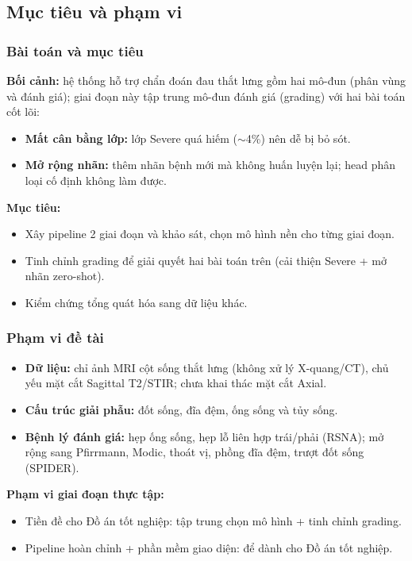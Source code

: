 \documentclass{beamer}
\numberwithin{figure}{section}
\numberwithin{table}{section}
\begin{document}
\subsection{Mục tiêu và phạm vi}
\begin{frame}
\frametitle{Bài toán và mục tiêu}
\textbf{Bối cảnh:} hệ thống hỗ trợ chẩn đoán đau thắt lưng gồm hai mô-đun (phân vùng và đánh giá); giai đoạn này tập trung mô-đun đánh giá (grading) với hai bài toán cốt lõi:
\begin{itemize}\small
    \item[\textbf{1.}] \textbf{Mất cân bằng lớp:} lớp Severe quá hiếm ($\sim$4\%) nên dễ bị bỏ sót.
    \item[\textbf{2.}] \textbf{Mở rộng nhãn:} thêm nhãn bệnh mới mà không huấn luyện lại; head phân loại cố định không làm được.
\end{itemize}
\vspace{0.3em}
\textbf{Mục tiêu:}
\begin{itemize}\small
    \item[--] Xây pipeline 2 giai đoạn và khảo sát, chọn mô hình nền cho từng giai đoạn.
    \item[--] Tinh chỉnh grading để giải quyết hai bài toán trên (cải thiện Severe + mở nhãn zero-shot).
    \item[--] Kiểm chứng tổng quát hóa sang dữ liệu khác.
\end{itemize}
\end{frame}

\begin{frame}
\frametitle{Phạm vi đề tài}
\begin{itemize}
    \item[--] \textbf{Dữ liệu:} chỉ ảnh MRI cột sống thắt lưng (không xử lý X-quang/CT), chủ yếu mặt cắt Sagittal T2/STIR; chưa khai thác mặt cắt Axial.
    \item[--] \textbf{Cấu trúc giải phẫu:} đốt sống, đĩa đệm, ống sống và tủy sống.
    \item[--] \textbf{Bệnh lý đánh giá:} hẹp ống sống, hẹp lỗ liên hợp trái/phải (RSNA); mở rộng sang Pfirrmann, Modic, thoát vị, phồng đĩa đệm, trượt đốt sống (SPIDER).
\end{itemize}
\pause
\textbf{Phạm vi giai đoạn thực tập:}
\begin{itemize}
    \item[--] Tiền đề cho Đồ án tốt nghiệp: tập trung chọn mô hình + tinh chỉnh grading.
    \item[$\rightarrow$] Pipeline hoàn chỉnh + phần mềm giao diện: để dành cho Đồ án tốt nghiệp.
\end{itemize}
\end{frame}
\end{document}
